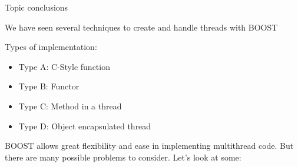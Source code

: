 \documentclass[8pt]{beamer}
\begin{document}
\begin{frame}{Topic conclusions}
 
We have seen several techniques to create and handle threads with BOOST

\begin{block}{Types of implementation:}
 
\begin{itemize}
  \item Type A: C-Style function
  \item Type B: Functor
  \item Type C: Method in a thread
  \item Type D: Object encapsulated thread
\end{itemize}
 
\end{block}

BOOST allows great flexibility and ease in implementing multithread code. But there are many possible problems to consider. Let's look at some:
 
\end{frame}
\end{document}
